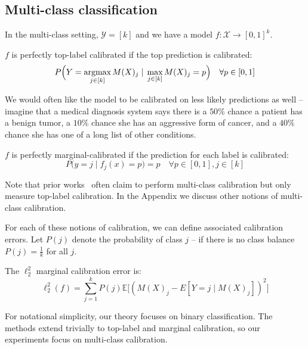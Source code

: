 \subsection{Multi-class classification}

In the multi-class setting, $\mathcal{Y} = [k]$ and we have a model $f : \mathcal{X} \to [0, 1]^k$.

\begin{definition}
$f$ is perfectly top-label calibrated if the top prediction is calibrated:
\[ P\Big(Y = \mathop{\mbox{argmax}}_{j \in [k]} M(X)_j \; | \; \max_{j \in [k]} M(X)_j = p\Big) \quad \forall p \in [0, 1] \]
\end{definition}

We would often like the model to be calibrated on less likely predictions as well -- imagine that a medical diagnosis system says there is a $50\%$ chance a patient has a benign tumor, a $10\%$ chance she has an aggressive form of cancer, and a $40\%$ chance she has one of a long list of other conditions.

\begin{definition}
$f$ is perfectly marginal-calibrated if the prediction for each label is calibrated:
\[ P\Big(y = j \; | \; f_j(x) = p\Big) = p \quad \forall p \in [0, 1], j \in [k] \]
\end{definition}

Note that prior works~\cite{guo2017calibration, hendrycks2019anomaly, hendrycks2019pretraining} often claim to perform multi-class calibration but only measure top-label calibration.
In the Appendix we discuss other notions of multi-class calibration.

For each of these notions of calibration, we can define associated calibration errors.
Let $P(j)$ denote the probability of class $j$ -- if there is no class balance $P(j) = \frac{1}{k}$ for all $j$.

\begin{definition}
The $\ell_2^2$ marginal calibration error is:
\[ \ell_2^2(f) = \sum_{j = 1}^k P(j) \mathbb{E}\big[ (M(X)_j - E[Y = j \; | \; M(X)_j])^2 \big] \]
\end{definition}

For notational simplicity, our theory focuses on binary classification.
The methods extend trivially to top-label and marginal calibration, so our experiments focus on multi-class calibration.

